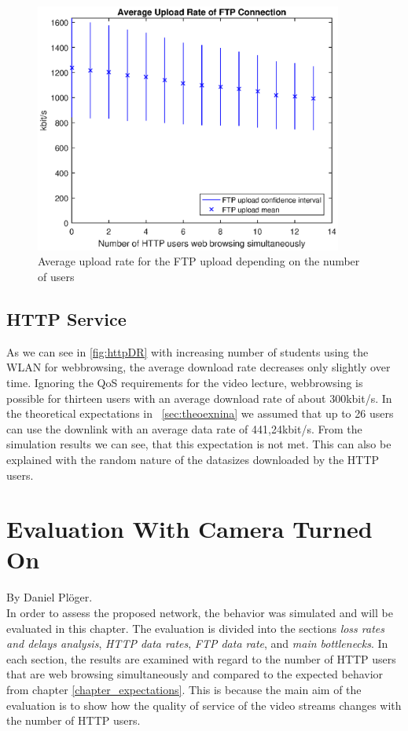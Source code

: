 \documentclass[a4paper,10pt]{book}\usepackage{graphicx}
\begin{document}
\begin{figure}[!ht]
  \begin{center}
    \includegraphics[width=0.9\textwidth]{off_ftp_upload.eps}
    \caption{Average upload rate for the FTP upload depending on the number of users}
    \label{fig:ftpUpR}
  \end{center}
\end{figure}

\section{HTTP Service}
As we can see in \ref{fig:httpDR} with increasing number of students using the WLAN for webbrowsing, the average download rate decreases only slightly over time. 
Ignoring the QoS requirements for the video lecture, webbrowsing is possible for thirteen users with an average download rate of about 300kbit/s.
In the theoretical expectations in ~\ref{sec:theoexnina} we assumed that up to 26 users can use the downlink with an average data rate of 441,24kbit/s. From the simulation results we can see,
that this expectation is not met. This can also be explained with the random nature of the datasizes downloaded by the HTTP users.
\chapter{Evaluation With Camera Turned On}
By Daniel Plöger.\\

In order to assess the proposed network, the behavior was simulated and will be evaluated in this chapter. The evaluation is divided into the sections \textit{loss rates and delays analysis}, \textit{HTTP data rates}, \textit{FTP data rate}, and \textit{main bottlenecks}. In each section, the results are examined with regard to the number of HTTP users that are web browsing simultaneously and compared to the expected behavior from chapter \ref{chapter_expectations}. This is because the main aim of the evaluation is to show how the quality of service of the video streams changes with the number of HTTP users. 
\end{document}
